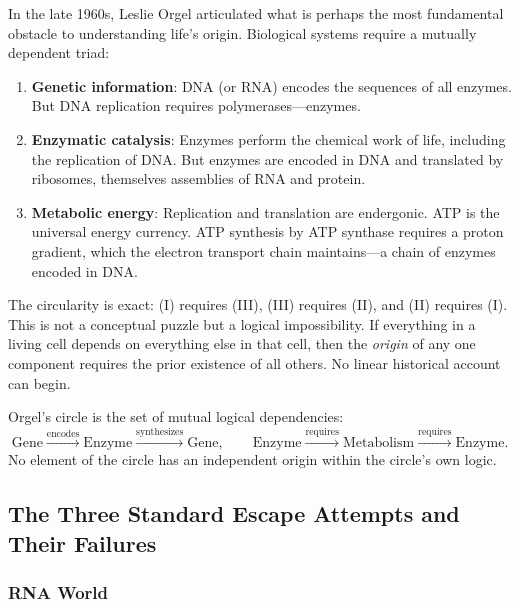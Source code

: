 In the late 1960s, Leslie Orgel articulated what is perhaps the most fundamental
obstacle to understanding life's origin. Biological systems require a mutually
dependent triad:

\begin{enumerate}[label=(\Roman*)]
  \item \textbf{Genetic information}: DNA (or RNA) encodes the sequences of
        all enzymes. But DNA replication requires polymerases---enzymes.
  \item \textbf{Enzymatic catalysis}: Enzymes perform the chemical work of
        life, including the replication of DNA. But enzymes are encoded in
        DNA and translated by ribosomes, themselves assemblies of RNA and
        protein.
  \item \textbf{Metabolic energy}: Replication and translation are endergonic.
        ATP is the universal energy currency. ATP synthesis by ATP synthase
        requires a proton gradient, which the electron transport chain
        maintains---a chain of enzymes encoded in DNA.
\end{enumerate}

The circularity is exact: (I) requires (III), (III) requires (II), and (II)
requires (I). This is not a conceptual puzzle but a logical impossibility.
If everything in a living cell depends on everything else in that cell, then
the \emph{origin} of any one component requires the prior existence of all others.
No linear historical account can begin.

\begin{definition}
\label{def:orgels_circle}
Orgel's circle is the set of mutual logical dependencies:
\begin{equation}
  \mathrm{Gene} \xrightarrow{\text{encodes}} \mathrm{Enzyme} \xrightarrow{\text{synthesizes}}
  \mathrm{Gene}, \qquad
  \mathrm{Enzyme} \xrightarrow{\text{requires}} \mathrm{Metabolism} \xrightarrow{\text{requires}}
  \mathrm{Enzyme}.
  \label{eq:orgels_circle}
\end{equation}
No element of the circle has an independent origin within the circle's own logic.
\end{definition}

\subsection{The Three Standard Escape Attempts and Their Failures}

\subsubsection{RNA World}

